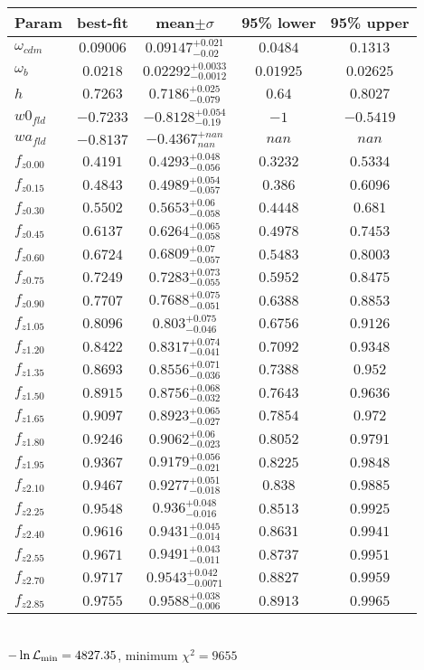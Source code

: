 \begin{tabular}{|l|c|c|c|c|} 
 \hline 
Param & best-fit & mean$\pm\sigma$ & 95\% lower & 95\% upper \\ \hline 
$\omega_{cdm }$ &$0.09006$ & $0.09147_{-0.02}^{+0.021}$ & $0.0484$ & $0.1313$ \\ 
$\omega_{b }$ &$0.0218$ & $0.02292_{-0.0012}^{+0.0033}$ & $0.01925$ & $0.02625$ \\ 
$h$ &$0.7263$ & $0.7186_{-0.079}^{+0.025}$ & $0.64$ & $0.8027$ \\ 
$w0_{fld }$ &$-0.7233$ & $-0.8128_{-0.19}^{+0.054}$ & $-1$ & $-0.5419$ \\ 
$wa_{fld }$ &$-0.8137$ & $-0.4367_{nan}^{+nan}$ & $nan$ & $nan$ \\ 
$f_{z0.00 }$ &$0.4191$ & $0.4293_{-0.056}^{+0.048}$ & $0.3232$ & $0.5334$ \\ 
$f_{z0.15 }$ &$0.4843$ & $0.4989_{-0.057}^{+0.054}$ & $0.386$ & $0.6096$ \\ 
$f_{z0.30 }$ &$0.5502$ & $0.5653_{-0.058}^{+0.06}$ & $0.4448$ & $0.681$ \\ 
$f_{z0.45 }$ &$0.6137$ & $0.6264_{-0.058}^{+0.065}$ & $0.4978$ & $0.7453$ \\ 
$f_{z0.60 }$ &$0.6724$ & $0.6809_{-0.057}^{+0.07}$ & $0.5483$ & $0.8003$ \\ 
$f_{z0.75 }$ &$0.7249$ & $0.7283_{-0.055}^{+0.073}$ & $0.5952$ & $0.8475$ \\ 
$f_{z0.90 }$ &$0.7707$ & $0.7688_{-0.051}^{+0.075}$ & $0.6388$ & $0.8853$ \\ 
$f_{z1.05 }$ &$0.8096$ & $0.803_{-0.046}^{+0.075}$ & $0.6756$ & $0.9126$ \\ 
$f_{z1.20 }$ &$0.8422$ & $0.8317_{-0.041}^{+0.074}$ & $0.7092$ & $0.9348$ \\ 
$f_{z1.35 }$ &$0.8693$ & $0.8556_{-0.036}^{+0.071}$ & $0.7388$ & $0.952$ \\ 
$f_{z1.50 }$ &$0.8915$ & $0.8756_{-0.032}^{+0.068}$ & $0.7643$ & $0.9636$ \\ 
$f_{z1.65 }$ &$0.9097$ & $0.8923_{-0.027}^{+0.065}$ & $0.7854$ & $0.972$ \\ 
$f_{z1.80 }$ &$0.9246$ & $0.9062_{-0.023}^{+0.06}$ & $0.8052$ & $0.9791$ \\ 
$f_{z1.95 }$ &$0.9367$ & $0.9179_{-0.021}^{+0.056}$ & $0.8225$ & $0.9848$ \\ 
$f_{z2.10 }$ &$0.9467$ & $0.9277_{-0.018}^{+0.051}$ & $0.838$ & $0.9885$ \\ 
$f_{z2.25 }$ &$0.9548$ & $0.936_{-0.016}^{+0.048}$ & $0.8513$ & $0.9925$ \\ 
$f_{z2.40 }$ &$0.9616$ & $0.9431_{-0.014}^{+0.045}$ & $0.8631$ & $0.9941$ \\ 
$f_{z2.55 }$ &$0.9671$ & $0.9491_{-0.011}^{+0.043}$ & $0.8737$ & $0.9951$ \\ 
$f_{z2.70 }$ &$0.9717$ & $0.9543_{-0.0071}^{+0.042}$ & $0.8827$ & $0.9959$ \\ 
$f_{z2.85 }$ &$0.9755$ & $0.9588_{-0.006}^{+0.038}$ & $0.8913$ & $0.9965$ \\ 
\hline 
 \end{tabular} \\ 
$-\ln{\cal L}_\mathrm{min} =4827.35$, minimum $\chi^2=9655$ \\ 
